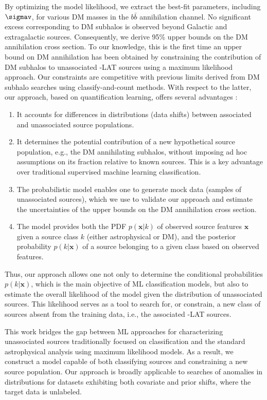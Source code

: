 By optimizing the model likelihood, we extract the best-fit parameters, including $\sigmav$, for various DM masses in the $b\bar{b}$ annihilation channel.
No significant excess corresponding to DM subhalos is observed beyond Galactic and extragalactic sources.
Consequently, we derive 95\% upper bounds on the DM annihilation cross section. To our knowledge, this is the first time an upper bound on DM annihilation has been obtained by constraining the contribution of DM subhalos to unassociated \Fermi-LAT sources using a maximum likelihood approach.
Our constraints are competitive with previous limits derived from DM subhalo searches using classify-and-count methods.
With respect to the latter, our approach, based on quantification learning, offers several advantages :
\begin{enumerate}[label=(\roman*)]
    \item It accounts for differences in distributions (data shifts) between associated and unassociated source populations.
    \item It determines the potential contribution of a new hypothetical source population, e.g., the DM annihilating subhalos, without imposing ad hoc assumptions on its fraction relative to known sources. This is a key advantage over traditional supervised machine learning classification.
    \item The probabilistic model enables one to generate mock data (samples of unassociated sources), which we use to validate our approach and estimate the uncertainties of the upper bounds on the DM annihilation cross section. 
    \item The model provides both the PDF $p(\textbf{x}|k)$ of observed source features $\textbf{x}$ given a source class $k$ (either astrophysical or DM), and the posterior probability $p(k|\textbf{x})$ of a source belonging to a given class based on observed features.
\end{enumerate}
Thus, our approach allows one not only to determine
the conditional probabilities $p(k|\textbf{x})$, which is the main objective of ML classification models, but also to estimate the overall likelihood of the model given the distribution of unassociated sources. This likelihood serves as a tool to search for, or constrain, a new class of sources absent from the training data, i.e., the associated \Fermi-LAT sources.

This work bridges the gap between ML approaches for characterizing unassociated sources traditionally focused on classification and the standard astrophysical analysis using maximum likelihood models. As a result, we construct a model capable of both classifying sources and constraining a new source population. 
Our approach is broadly applicable to searches of anomalies in distributions for datasets exhibiting both covariate and prior shifts, where the target data is unlabeled.

